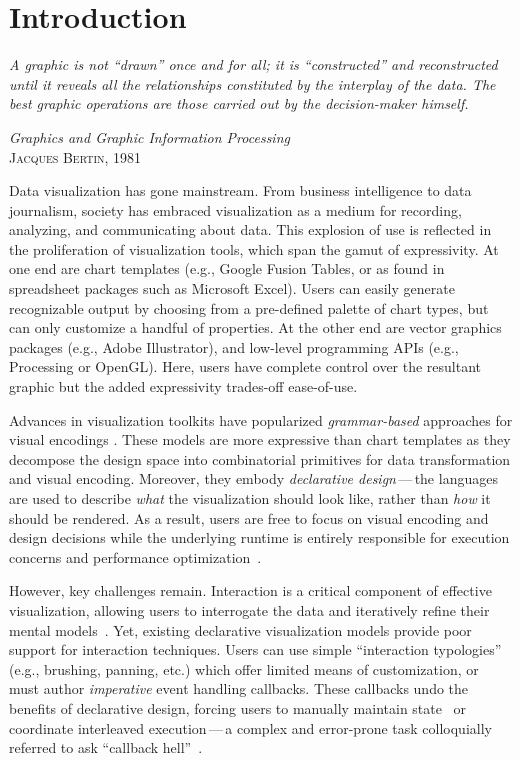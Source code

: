 \chapter{Introduction}

\setlength{}
\epigraph{\textit{A graphic is not ``drawn'' once and for all; it is
``constructed'' and reconstructed until it reveals all the relationships
 constituted by the interplay of the data. The best graphic operations are those
 carried out by the decision-maker himself.}} {\textit{Graphics and Graphic
 Information Processing}\\\textsc{Jacques Bertin, 1981}}

Data visualization has gone mainstream. From business intelligence to data
journalism, society has embraced visualization as a medium for recording,
analyzing, and communicating about data. This explosion of use is reflected in
the proliferation of visualization tools, which span the gamut of expressivity.
At one end are chart templates (e.g., Google Fusion Tables, or as found in
spreadsheet packages such as Microsoft Excel). Users can easily generate
recognizable output by choosing from a pre-defined palette of chart types, but
can only customize a handful of properties. At the other end are vector graphics
packages (e.g., Adobe Illustrator), and low-level programming APIs (e.g.,
Processing or OpenGL). Here, users have complete control over the resultant
graphic but the added expressivity trades-off ease-of-use.

Advances in visualization toolkits have popularized \emph{grammar-based}
approaches for visual encodings
\cite{wilkinson:grammar,stolte:polaris,wickham:layered,bostock:protovis,bostock:d3}.
These models are more expressive than chart templates as they decompose the
design space into combinatorial primitives for data transformation and visual
encoding. Moreover, they embody \emph{declarative design}\,---\,the languages
are used to describe \emph{what} the visualization should look like, rather than
\emph{how} it should be rendered. As a result, users are free to focus on visual
encoding and design decisions while the underlying runtime is entirely
responsible for execution concerns and performance
optimization~\cite{heer:protovisjava}.

However, key challenges remain. Interaction is a critical component of effective
visualization, allowing users to interrogate the data and iteratively refine
their mental models~\cite{pike:interactionscience,yi:understanding}. Yet,
existing declarative visualization models provide poor support for interaction
techniques. Users can use simple ``interaction typologies'' (e.g., brushing,
panning, etc.) which offer limited means of customization, or must author
\emph{imperative} event handling callbacks. These callbacks undo the benefits of
declarative design, forcing users to manually maintain
state~\cite{cooper:embedding} or coordinate interleaved execution\,---\,a
complex and error-prone task colloquially referred to ask ``callback
hell''~\cite{edwards:coherent}.


